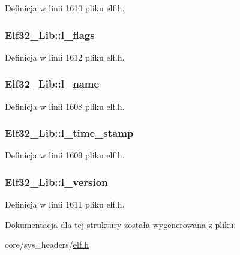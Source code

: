 Definicja w linii 1610 pliku elf.\-h.

\hypertarget{struct_elf32___lib_a4a0feb8162591596d3653f561ee8759e}{
\subsubsection[{l\-\_\-flags}]{ Elf32\-\_\-\-Lib\-::l\-\_\-flags}}\label{struct_elf32___lib_a4a0feb8162591596d3653f561ee8759e}


Definicja w linii 1612 pliku elf.\-h.

\hypertarget{struct_elf32___lib_af40827a2882aaf96d42ae60dac6551ee}{
\subsubsection[{l\-\_\-name}]{ Elf32\-\_\-\-Lib\-::l\-\_\-name}}\label{struct_elf32___lib_af40827a2882aaf96d42ae60dac6551ee}


Definicja w linii 1608 pliku elf.\-h.

\hypertarget{struct_elf32___lib_ae7119079569dcf7ecebccc47cb6350be}{
\subsubsection[{l\-\_\-time\-\_\-stamp}]{ Elf32\-\_\-\-Lib\-::l\-\_\-time\-\_\-stamp}}\label{struct_elf32___lib_ae7119079569dcf7ecebccc47cb6350be}


Definicja w linii 1609 pliku elf.\-h.

\hypertarget{struct_elf32___lib_ab1be8296800ef7b233adb56f1cfb901c}{
\subsubsection[{l\-\_\-version}]{ Elf32\-\_\-\-Lib\-::l\-\_\-version}}\label{struct_elf32___lib_ab1be8296800ef7b233adb56f1cfb901c}


Definicja w linii 1611 pliku elf.\-h.



Dokumentacja dla tej struktury została wygenerowana z pliku\-:\begin{DoxyCompactItemize}
\item 
core/sys\-\_\-headers/\hyperlink{elf_8h}{elf.\-h}\end{DoxyCompactItemize}
